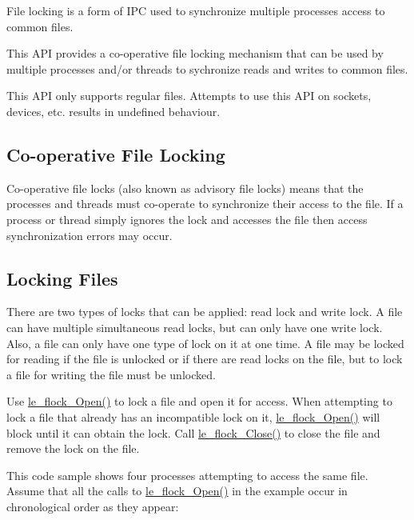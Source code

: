 File locking is a form of I\+P\+C used to synchronize multiple processes\textquotesingle{} access to common files.

This A\+P\+I provides a co-\/operative file locking mechanism that can be used by multiple processes and/or threads to sychronize reads and writes to common files.

This A\+P\+I only supports regular files. Attempts to use this A\+P\+I on sockets, devices, etc. results in undefined behaviour.\hypertarget{c_flock_c_flock_cooperative}{}\subsection{Co-\/operative File Locking}\label{c_flock_c_flock_cooperative}
Co-\/operative file locks (also known as advisory file locks) means that the processes and threads must co-\/operate to synchronize their access to the file. If a process or thread simply ignores the lock and accesses the file then access synchronization errors may occur.\hypertarget{c_flock_c_flock_locks}{}\subsection{Locking Files}\label{c_flock_c_flock_locks}
There are two types of locks that can be applied\+: read lock and write lock. A file can have multiple simultaneous read locks, but can only have one write lock. Also, a file can only have one type of lock on it at one time. A file may be locked for reading if the file is unlocked or if there are read locks on the file, but to lock a file for writing the file must be unlocked.

Use {\ttfamily \hyperlink{le__file_lock_8h_aac3e11a6f7f363d29b8dbb1eb6c2c287}{le\+\_\+flock\+\_\+\+Open()}} to lock a file and open it for access. When attempting to lock a file that already has an incompatible lock on it, {\ttfamily \hyperlink{le__file_lock_8h_aac3e11a6f7f363d29b8dbb1eb6c2c287}{le\+\_\+flock\+\_\+\+Open()}} will block until it can obtain the lock. Call {\ttfamily \hyperlink{le__file_lock_8h_a457a07dbf8967757322f531d5beb10b6}{le\+\_\+flock\+\_\+\+Close()}} to close the file and remove the lock on the file.

This code sample shows four processes attempting to access the same file. Assume that all the calls to \hyperlink{le__file_lock_8h_aac3e11a6f7f363d29b8dbb1eb6c2c287}{le\+\_\+flock\+\_\+\+Open()} in the example occur in chronological order as they appear\+:


